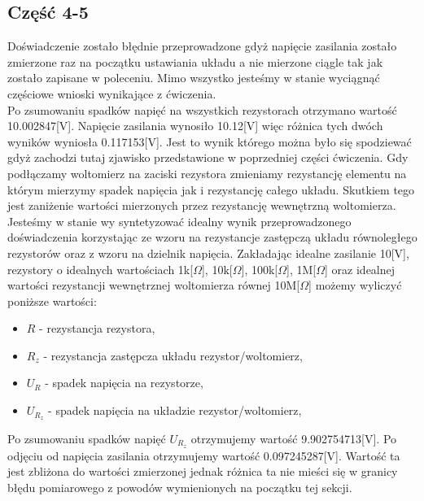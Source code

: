 \documentclass[11pt]{article}
\begin{document}
    \subsection*{Część 4-5}
    Doświadczenie zostało błędnie przeprowadzone gdyż napięcie zasilania zostało zmierzone raz na
    początku ustawiania układu a nie mierzone ciągle tak jak zostało zapisane w poleceniu.
    Mimo wszystko jesteśmy w stanie wyciągnąć częściowe wnioski wynikające z ćwiczenia.\\
    \indent Po zsumowaniu spadków napięć na wszystkich rezystorach otrzymano wartość 10.002847[V].
    Napięcie zasilania wynosiło 10.12[V] więc różnica tych dwóch wyników wyniosła 0.117153[V].
    Jest to wynik którego można było się spodziewać gdyż zachodzi tutaj zjawisko przedstawione w poprzedniej części ćwiczenia.
    Gdy podłączamy woltomierz na zaciski rezystora zmieniamy rezystancję elementu na którym mierzymy spadek napięcia jak i rezystancję całego układu.
    Skutkiem tego jest zaniżenie wartości mierzonych przez rezystancję wewnętrzną woltomierza.\\
    \indent Jesteśmy w stanie wy syntetyzować idealny wynik przeprowadzonego doświadczenia korzystając
    ze wzoru na rezystancje zastępczą układu równoległego rezystorów oraz z wzoru na dzielnik napięcia.
    Zakładając idealne zasilanie 10[V], rezystory o idealnych wartościach 1k[$\Omega$], 10k[$\Omega$],
    100k[$\Omega$], 1M[$\Omega$] oraz idealnej wartości rezystancji wewnętrznej woltomierza równej 10M[$\Omega$] możemy wyliczyć poniższe wartości:
    \begin{center}
    \end{center}
    {\footnotesize
        \begin{itemize}
            \setlength\itemsep{0em}
            \item[] \boldmath$R$ - rezystancja rezystora,
            \item[] \boldmath$R_z$ - rezystancja zastępcza układu rezystor/woltomierz,
            \item[] \boldmath$U_R$ - spadek napięcia na rezystorze,
            \item[] \boldmath$U_{R_z}$ - spadek napięcia na układzie rezystor/woltomierz,
        \end{itemize}}
    \indent Po zsumowaniu spadków napięć $U_{R_z}$ otrzymujemy
    wartość 9.902754713[V]. Po odjęciu od napięcia zasilania
    otrzymujemy wartość 0.097245287[V].
    Wartość ta jest zbliżona do wartości zmierzonej jednak różnica ta
    nie mieści się w granicy błędu pomiarowego z powodów wymienionych na początku tej sekcji.
\end{document}
